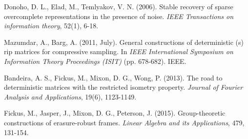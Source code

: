 \documentclass[a4paper,12pt]{article}
\begin{document}
\begin{thebibliography}{1}
 Donoho, D. L., Elad, M., Temlyakov, V. N. (2006). Stable recovery of sparse overcomplete representations in the presence of noise.  \emph{IEEE Transactions on information theory}, 52(1), 6-18.






 Mazumdar, A., Barg, A. (2011, July). General constructions of deterministic (s) rip matrices for compressive sampling. In \emph{IEEE International Symposium on Information Theory Proceedings (ISIT)} (pp. 678-682). IEEE.


 Bandeira, A. S., Fickus, M., Mixon, D. G., Wong, P. (2013). The road to deterministic matrices with the restricted isometry property. \emph{Journal of Fourier Analysis and Applications}, 19(6), 1123-1149.


 Fickus, M., Jasper, J., Mixon, D. G., Peterson, J. (2015). Group-theoretic constructions of erasure-robust frames. \emph{Linear Algebra and its Applications}, 479, 131-154.



\end{thebibliography}
\end{document}
